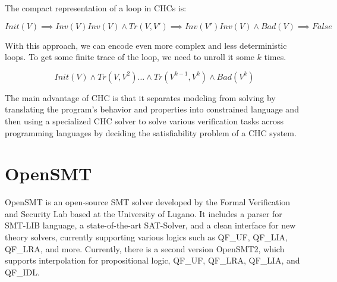 The compact representation of a loop in CHCs is:

\vspace{\baselineskip}
\begin{equation}
    Init(V) \implies Inv(V)
    Inv(V) \land Tr(V, V') \implies Inv(V')
    Inv(V) \land Bad(V) \implies False
\end{equation}

With this approach, we can encode even more complex and less deterministic loops. To get some finite trace of the loop, we need to unroll it some $k$ times.

\vspace{\baselineskip}
\begin{equation}
    Init(V) \land Tr(V, V^2) \dots \land Tr(V^{k-1}, V^k) \land Bad(V^k)
\end{equation}


The main advantage of CHC is that it separates modeling
from solving by translating the program’s behavior and properties into
constrained language and then using a specialized CHC solver to solve various
verification tasks across programming languages by deciding the satisfiability
problem of a CHC system. 

\section{OpenSMT}
\noindent OpenSMT\cite{10.1007/978-3-642-12002-2_12} is an open-source SMT solver developed by the Formal Verification and Security Lab based at the University of Lugano. It includes a parser for SMT-LIB\cite{BarFT-SMTLIB} language, a state-of-the-art SAT-Solver, and a clean interface for new theory solvers, currently supporting various logics such as QF\_UF, QF\_LIA, QF\_LRA, and more. Currently, there is a second version OpenSMT2\cite{10.1007/978-3-319-40970-2_35}, which supports interpolation for propositional logic, QF\_UF, QF\_LRA, QF\_LIA, and QF\_IDL.




